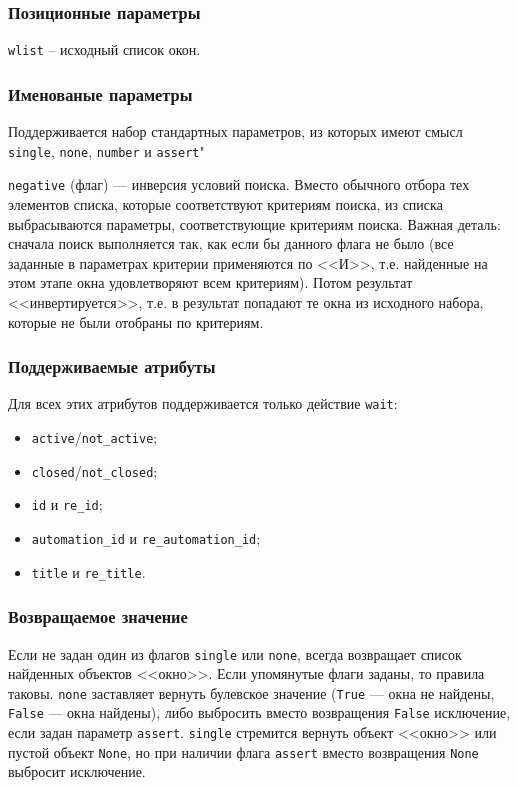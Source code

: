 \documentclass[11pt]{book} %
\begin{document}
\subsubsection*{Позиционные параметры} 

\verb"wlist" -- исходный список окон.

\subsubsection*{Именованые параметры} 

Поддерживается набор стандартных параметров, из которых имеют смысл \verb"single", \verb|none|, \verb|number| и \verb"assert""


\verb"negative" (флаг) --- инверсия условий поиска. Вместо обычного отбора тех элементов списка, которые соответствуют критериям поиска, из списка выбрасываются параметры, соответствующие критериям поиска. Важная деталь: сначала поиск выполняется так, как если бы данного флага не было (все заданные в параметрах критерии применяются по <<И>>, т.е. найденные на этом этапе окна удовлетворяют всем критериям). Потом результат <<инвертируется>>, т.е. в результат попадают те окна из исходного набора, которые не были отобраны по критериям.


\subsubsection*{Поддерживаемые атрибуты} 

Для всех этих атрибутов поддерживается только действие \verb|wait|:

\begin{itemize}
	\item \verb"active"/\verb"not_active";
	\item \verb"closed"/\verb"not_closed";
	\item \verb"id" и \verb"re_id";
	\item \verb"automation_id" и \verb"re_automation_id";
	\item \verb"title" и \verb"re_title".
\end{itemize}



\subsubsection*{Возвращаемое значение}
Если не задан один из флагов \verb"single" или \verb"none", всегда возвращает список найденных объектов <<окно>>. Если упомянутые флаги заданы, то правила таковы. \verb"none" заставляет вернуть булевское значение (\verb"True" --- окна не найдены, \verb"False" --- окна найдены), либо выбросить вместо возвращения \verb"False" исключение, если задан параметр \verb"assert". \verb"single" стремится вернуть объект <<окно>> или пустой объект \verb"None", но при наличии флага \verb"assert" вместо возвращения \verb"None" выбросит исключение.
\end{document}
